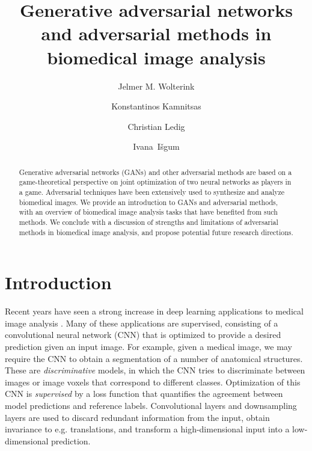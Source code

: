\documentclass{article}
\title{Generative adversarial networks and adversarial methods in biomedical image analysis}
\date{}
\author[1]{Jelmer M. Wolterink}
\author[2]{Konstantinos Kamnitsas}
\author[3]{Christian Ledig}
\author[1]{Ivana~I\v{s}gum}
\affil[1]{Image Sciences Institute, University Medical Center Utrecht, Utrecht, The Netherlands}
\affil[2]{Imperial College London, London, United Kingdom}
\affil[3]{Imagen Technologies, New York, New York, United States of America}
\begin{document}
\maketitle

\begin{abstract}
Generative adversarial networks (GANs) and other adversarial methods are based on a game-theoretical perspective on joint optimization of two neural networks as players in a game. Adversarial techniques have been extensively used to synthesize and analyze biomedical images. We provide an introduction to GANs and adversarial methods, with an overview of biomedical image analysis tasks that have benefited from such methods. We conclude with a discussion of strengths and limitations of adversarial methods in biomedical image analysis, and propose potential future research directions.
\end{abstract}

\section{Introduction}
Recent years have seen a strong increase in deep learning applications to medical image analysis \cite{Litj17}. Many of these applications are supervised, consisting of a convolutional neural network (CNN) that is optimized to provide a desired prediction given an input image. For example, given a medical image, we may require the CNN to obtain a segmentation of a number of anatomical structures. 
These are \textit{discriminative} models, in which the CNN tries to discriminate between images or image voxels that correspond to different classes. 
Optimization of this CNN is \textit{supervised} by a loss function that quantifies the agreement between model predictions and reference labels. Convolutional layers and downsampling layers are used to discard redundant information from the input, obtain invariance to e.g. translations, and transform a high-dimensional input into a low-dimensional prediction.
\end{document}
